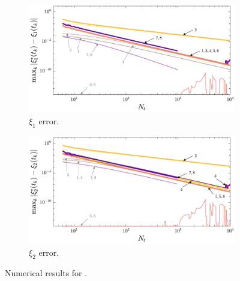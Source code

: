 \begin{figure}
\begin{subfigure}{0.5\textwidth}
\centering
\includegraphics[width=\textwidth]{../ch5/figures/ex2_sens_state_1}%
\caption{$\xi_1$ error.}
\label{fig:ch5:ex2sens:state:1}
\end{subfigure}%
\begin{subfigure}{0.5\textwidth}
\centering
\includegraphics[width=\textwidth]{../ch5/figures/ex2_sens_state_2}%
\caption{$\xi_2$ error.}
\label{fig:ch5:ex2sens:state:2}
\end{subfigure}%

\caption{Numerical results for .}
\label{fig:ch5:ex2sens}
\end{figure}